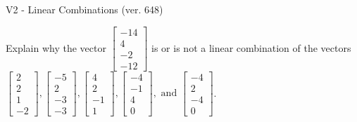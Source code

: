 \begin{exercise}
  \begin{exerciseTitle}V2 - Linear Combinations (ver. 648)\end{exerciseTitle}
  \begin{exerciseStatement}
    Explain why the vector \(\left[\begin{array}{c}
-14 \\
4 \\
-2 \\
-12
\end{array}\right]\)  is or is not a linear 
	combination of the vectors \(\left[\begin{array}{c}
2 \\
2 \\
1 \\
-2
\end{array}\right] , \left[\begin{array}{c}
-5 \\
2 \\
-3 \\
-3
\end{array}\right] , \left[\begin{array}{c}
4 \\
2 \\
-1 \\
1
\end{array}\right] , \left[\begin{array}{c}
-4 \\
-1 \\
4 \\
0
\end{array}\right] , \text{ and } \left[\begin{array}{c}
-4 \\
2 \\
-4 \\
0
\end{array}\right]\).
	



\end{exerciseStatement}
\end{exercise}
